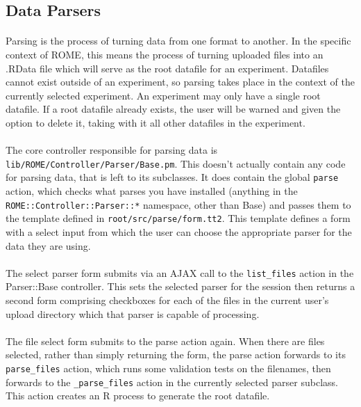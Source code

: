 \subsection{Data Parsers}
\label{sec:parsers}

\paragraph{}
Parsing is the process of turning data from one format to another. In the specific context of ROME, this means the process of turning uploaded files into an .RData file which will serve as the root datafile for an experiment. Datafiles cannot exist outside of an experiment, so parsing takes place in the context of the currently selected experiment. An experiment may only have a single root datafile. If a root datafile already exists, the user will be warned and given the option to delete it, taking with it all other datafiles in the experiment.

\paragraph*{}
The core controller responsible for parsing data is \texttt{lib/ROME/Controller/Parser/Base.pm}. This doesn't actually contain any code for parsing data, that is left to its subclasses. It does contain the global \verb|parse| action, which checks what parses you have installed (anything in the \texttt{ROME::Controller::Parser::*} namespace, other than Base) and passes them to the template defined in \texttt{root/src/parse/form.tt2}. This template defines a form with a select input from which the user can choose the appropriate parser for the data they are using. 

\paragraph*{}
The select parser form submits via an AJAX call to the \texttt{list\_files} action in the Parser::Base controller. This sets the selected parser for the session then returns a second form comprising checkboxes for each of the files in the current user's upload directory which that parser is capable of processing. 

\paragraph*{}
The file select form submits to the parse action again. When there are files selected, rather than simply returning the form, the parse action forwards to its \texttt{parse\_files} action, which runs some validation tests on the filenames, then forwards to the \texttt{\_parse\_files} action in the currently selected parser subclass. This action creates an R process to generate the root datafile.

